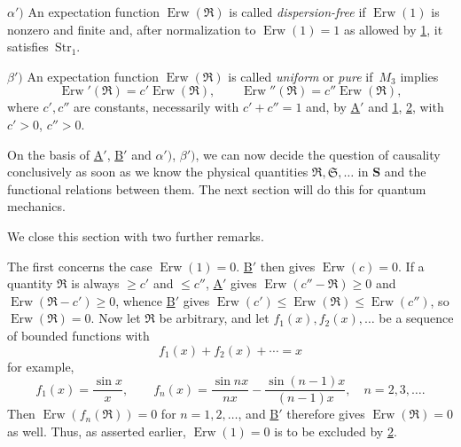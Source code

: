 \documentclass[fontsize=13pt,twoside,openany,headings=normal,parskip=false,bookmarkpackage=false,DIV=calc]{scrbook}
\begin{document}
\noindent{}$\alpha')$\label{def:IV.1.alphaprime} An expectation function $\operatorname{Erw}(\mathfrak R)$ is called \emph{dispersion-free} if $\operatorname{Erw}(1)$ is nonzero and finite and, after normalization to $\operatorname{Erw}(1)=1$ as allowed by \hyperref[remark:IV.1.1]{1}, it satisfies~\hyperref[eq:IV.1.Str1]{$\mathrm{Str}_1$}.

\noindent{}$\beta')$\label{def:IV.1.betaprime} An expectation function $\operatorname{Erw}(\mathfrak R)$ is called \emph{uniform} or \emph{pure} if~\hyperref[eq:IV.1.M3]{$M_3$} implies
\[
\operatorname{Erw}'(\mathfrak R)=c'\operatorname{Erw}(\mathfrak R),\qquad
\operatorname{Erw}''(\mathfrak R)=c''\operatorname{Erw}(\mathfrak R),
\]
where $c',c''$ are constants, necessarily with $c'+c''=1$ and, by \hyperref[cond:IV.Aprime]{A$'$} and \hyperref[remark:IV.1.1]{1}, \hyperref[remark:IV.1.2]{2}, with $c'>0$, $c''>0$.

On the basis of \hyperref[cond:IV.Aprime]{A$'$}, \hyperref[cond:IV.Bprime]{B$'$} and \hyperref[def:IV.1.alphaprime]{$\alpha')$}, \hyperref[def:IV.1.betaprime]{$\beta')$}, we can now decide the question of causality conclusively as soon as we know the physical quantities $\mathfrak R,\mathfrak S,\ldots$ in $\boldsymbol{S}$ and the functional relations between them. The next section will do this for quantum mechanics.

We close this section with two further remarks.

The first concerns the case $\operatorname{Erw}(1)=0$. \hyperref[cond:IV.Bprime]{B$'$} then gives $\operatorname{Erw}(c)=0$. If a quantity $\mathfrak R$ is always $\geq c'$ and $\leq c''$, \hyperref[cond:IV.Aprime]{A$'$} gives $\operatorname{Erw}(c''-\mathfrak R)\geq0$ and $\operatorname{Erw}(\mathfrak R-c')\geq0$, whence \hyperref[cond:IV.Bprime]{B$'$} gives $\operatorname{Erw}(c')\leq\operatorname{Erw}(\mathfrak R)\leq\operatorname{Erw}(c'')$, so $\operatorname{Erw}(\mathfrak R)=0$. Now let $\mathfrak R$ be arbitrary, and let $f_1(x),f_2(x),\ldots$ be a sequence of bounded functions with
\[
f_1(x)+f_2(x)+\cdots=x
\]
for example,
\[
f_1(x)=\frac{\sin x}{x},\qquad
f_n(x)=\frac{\sin nx}{nx}-\frac{\sin(n-1)x}{(n-1)x},\quad n=2,3,\ldots.
\]
Then $\operatorname{Erw}(f_n(\mathfrak R))=0$ for $n=1,2,\ldots$, and \hyperref[cond:IV.Bprime]{B$'$} therefore gives $\operatorname{Erw}(\mathfrak R)=0$ as well. Thus, as asserted earlier, $\operatorname{Erw}(1)=0$ is to be excluded by \hyperref[remark:IV.1.2]{2}.
\end{document}
